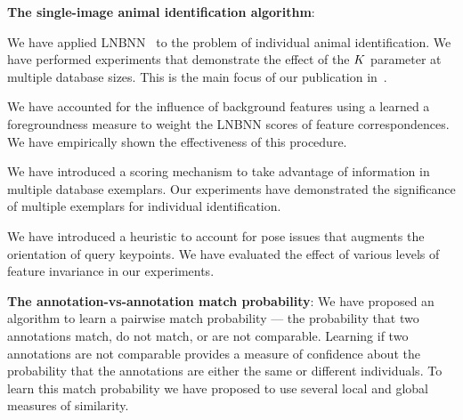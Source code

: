         \begin{itemln}

            \item \textbf{The single-image animal identification algorithm}:

                \begin{itemln}
                    \item We have applied LNBNN~\cite{mccann_local_2012} to the problem of individual animal
                    identification. We have performed experiments that demonstrate the effect of the $K$ parameter
                    at multiple database sizes. This is the main focus of our publication
                    in~\cite{crall_hotspotter_2013}.

                    \item We have accounted for the influence of background features using a learned a
                    foregroundness measure to weight the LNBNN scores of feature correspondences. We have
                    empirically shown the effectiveness of this procedure.

                    \item We have introduced a \name{} scoring mechanism to take advantage of information in
                    multiple database exemplars. Our experiments have demonstrated the significance of multiple
                    exemplars for individual identification.

                    \item 
                        We have introduced a heuristic to account for pose issues that augments the orientation of
                        query keypoints. We have evaluated the effect of various levels of feature invariance in
                        our experiments.
                \end{itemln}

           \item \textbf{The annotation-vs-annotation match probability}:
                We have proposed an algorithm to learn a pairwise match probability --- the probability that two
                annotations match, do not match, or are not comparable. Learning if two annotations are not
                comparable provides a measure of confidence about the probability that the annotations are either
                the same or different individuals. To learn this match probability we have proposed to use several
                local and global measures of similarity.


\end{itemln}
